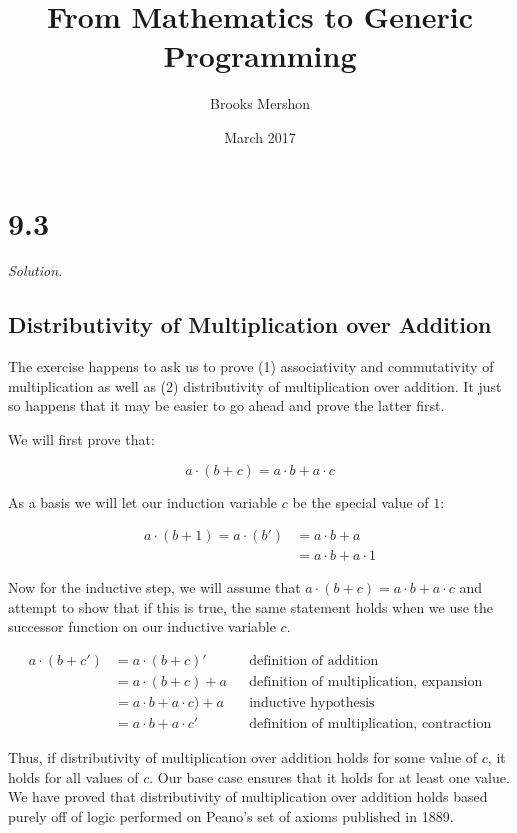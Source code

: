 \documentclass{article}
\title{From Mathematics to Generic Programming}
\author{Brooks Mershon}
\date{March 2017}
\begin{document}
\maketitle

\section*{9.3}

\textit{Solution.}

\subsection*{Distributivity of Multiplication over Addition}

The exercise happens to ask us to prove (1) associativity and commutativity of multiplication as well as (2) distributivity of multiplication over addition. It just so happens that it may be easier to go ahead and prove the latter first.

We will first prove that:

$$a \cdot (b + c) = a \cdot b + a \cdot c$$

As a basis we will let our induction variable $c$ be the special value of $1$:

\begin{align*}
a \cdot (b + 1) = a \cdot (b') &= a \cdot b + a \\
&= a \cdot b + a \cdot 1
\end{align*}

Now for the inductive step, we will assume that $a \cdot (b + c) = a \cdot b + a \cdot c$ and attempt to show that if this is true, the same statement holds when we use the successor function on our inductive variable $c$.

\begin{align*}
a \cdot (b + c') &= a \cdot (b + c)' && \text{definition of addition} \\
&= a \cdot (b + c) + a && \text{definition of multiplication, expansion} \\
&= a \cdot b + a \cdot c) + a && \text{inductive hypothesis} \\
&= a \cdot b + a \cdot c' && \text{definition of multiplication, contraction}
\end{align*}

Thus, if distributivity of multiplication over addition holds for some value of $c$, it holds for all values of $c$. Our base case ensures that it holds for at least one value. We have proved that distributivity of multiplication over addition holds based purely off of logic performed on Peano's set of axioms published in 1889.
\end{document}

